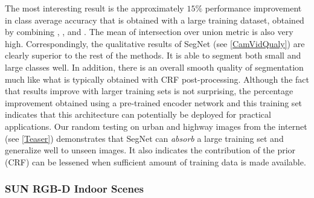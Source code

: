 The most interesting result is the approximately $15\%$ performance improvement in class average accuracy that is obtained with a large training dataset, obtained by combining \citet{gould2009decomposing}, \citet{russell2008labelme}, \citet{brostow2009semantic} and \citet{Geiger2012CVPR}. The mean of intersection over union metric is also very high. Correspondingly, the qualitative results of SegNet (see \cref{CamVidQualy}) are clearly superior to the rest of the methods. It is able to segment both small and large classes well. In addition, there is an overall smooth quality of segmentation much like what is typically obtained with CRF post-processing. Although the fact that results improve with larger training sets is not surprising, the percentage improvement obtained using a pre-trained encoder network and this training set indicates that this architecture can potentially be deployed for practical applications. Our random testing on urban and highway images from the internet (see \cref{Teaser}) demonstrates that SegNet can \textit{absorb} a large training set and generalize well to unseen images. It also indicates the contribution of the prior (CRF) can be lessened when sufficient amount of training data is made available.

\subsubsection{SUN RGB-D Indoor Scenes}
\label{SUNRGBD}

